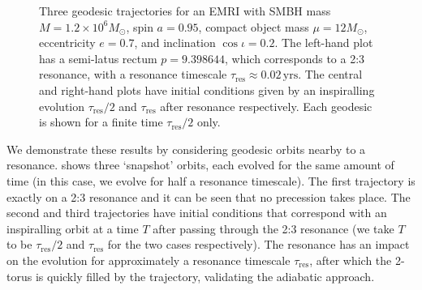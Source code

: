 \begin{figure}[htbp]
\centering
{}
\caption{\label{fig:res-geotraj}Three geodesic trajectories for an EMRI with SMBH mass $M = 1.2\times10^6 M_\odot$, spin $a=0.95$, compact object mass $\mu = 12 M_\odot$, eccentricity $e = 0.7$, and inclination $\cos\iota = 0.2$. The left-hand plot has a semi-latus rectum $p = 9.398644$, which corresponds to a 2:3 resonance, with a resonance timescale $\tau_\mathrm{res}\approx0.02\,\mathrm{yrs}$. The central and right-hand plots have initial conditions given by an inspiralling evolution $\tau_\mathrm{res}/2$ and $\tau_\mathrm{res}$ after resonance respectively. Each geodesic is shown for a finite time $\tau_\mathrm{res}/2$ only.}
\end{figure}

We demonstrate these results by considering geodesic orbits nearby to a resonance.  shows three `snapshot' orbits, each evolved for the same amount of time (in this case, we evolve for half a resonance timescale). The first trajectory is exactly on a 2:3 resonance and it can be seen that no precession takes place. The second and third trajectories have initial conditions that correspond with an inspiralling orbit at a time $T$ after passing through the 2:3 resonance (we take $T$ to be $\tau_\mathrm{res}/2$ and $\tau_\mathrm{res}$ for the two cases respectively). The resonance has an impact on the evolution for approximately a resonance timescale $\tau_\mathrm{res}$, after which the 2-torus is quickly filled by the trajectory, validating the adiabatic approach.

